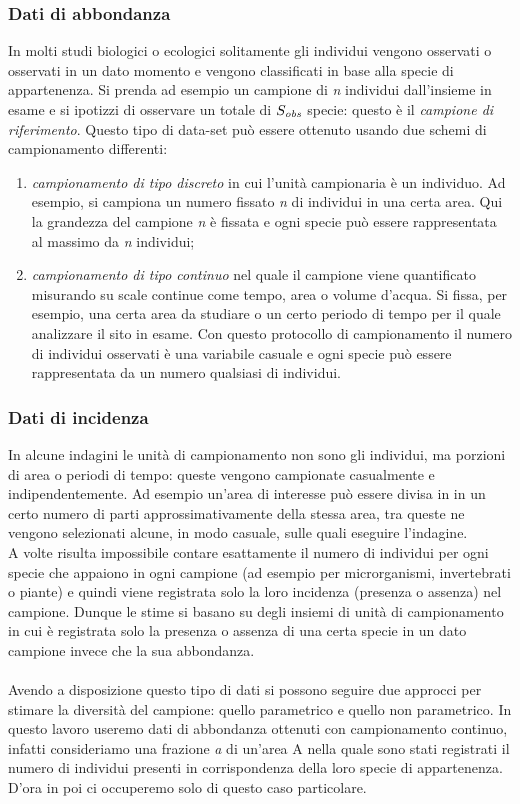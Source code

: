 \subsubsection{Dati di abbondanza}
In molti studi biologici o ecologici solitamente gli individui vengono osservati o osservati in un dato momento e vengono classificati in base alla specie di appartenenza. Si prenda ad esempio un campione di \emph{n} individui dall'insieme in esame e si ipotizzi di osservare un totale di $S_\emph{obs}$ specie: questo è il \emph{campione di riferimento}. Questo tipo di data-set può essere ottenuto usando due schemi di campionamento differenti:
\begin{enumerate}
    \item \emph{campionamento di tipo discreto} in cui l'unità campionaria è un individuo. Ad esempio, si campiona un numero fissato \emph{n} di individui in una certa area. Qui la grandezza del campione \emph{n} è fissata e ogni specie può essere rappresentata al massimo da \emph{n} individui;
    
    \item \emph{campionamento di tipo continuo} nel quale il campione viene quantificato misurando su scale continue come tempo, area o volume d'acqua.
    Si fissa, per esempio, una certa area da studiare o un certo periodo di tempo per il quale analizzare il sito in esame. Con questo protocollo di campionamento il numero di individui osservati è una variabile casuale e ogni specie può essere rappresentata da un numero qualsiasi di individui.
\end{enumerate}

\subsubsection{Dati di incidenza}
In alcune indagini le unità di campionamento non sono gli individui, ma porzioni di area o periodi di tempo: queste vengono campionate casualmente e indipendentemente. Ad esempio un'area di interesse può essere divisa in in un certo numero di parti approssimativamente della stessa area, tra queste ne vengono selezionati alcune, in modo casuale, sulle quali eseguire l'indagine.\\
A volte risulta impossibile contare esattamente il numero di individui per ogni specie che appaiono in ogni campione (ad esempio per microrganismi, invertebrati o piante) e quindi viene registrata solo la loro incidenza (presenza o assenza) nel campione. Dunque le stime si basano su degli insiemi di unità di campionamento in cui è registrata solo la presenza o assenza di una certa specie in un dato campione invece che la sua abbondanza.
\\ \\
Avendo a disposizione questo tipo di dati si possono seguire due approcci per stimare la diversità del campione: quello parametrico e quello non parametrico.
In questo lavoro useremo dati di abbondanza ottenuti con campionamento continuo, infatti consideriamo una frazione \emph{a} di un'area A nella quale sono stati registrati il numero di individui presenti in corrispondenza della loro specie di appartenenza. D'ora in poi ci occuperemo solo di questo caso particolare.

